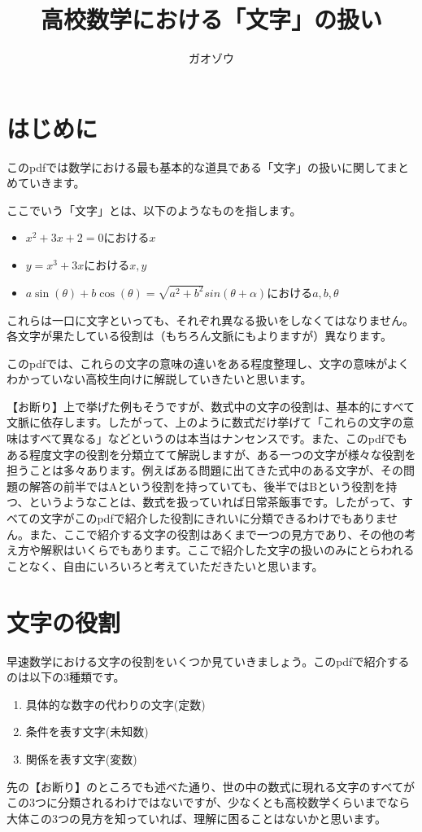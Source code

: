 \documentclass[uplatex,dvipdfmx]{jsarticle}
\title{高校数学における「文字」の扱い}
\author{ガオゾウ}
\begin{document}
	\maketitle
	
	\section{はじめに}
	このpdfでは数学における最も基本的な道具である「文字」の扱いに関してまとめていきます。
	
	ここでいう「文字」とは、以下のようなものを指します。
	\begin{itemize}
		\item $ x^2 + 3x + 2 = 0 $における$x$
		\item $ y = x^3 + 3x $における$x,y$
		\item $ a\sin(\theta) + b\cos(\theta) = \sqrt{a^2+b^2}sin(\theta + \alpha) $における$a,b,\theta$
	\end{itemize}
	
	これらは一口に文字といっても、それぞれ異なる扱いをしなくてはなりません。各文字が果たしている役割は（もちろん文脈にもよりますが）異なります。
	
	このpdfでは、これらの文字の意味の違いをある程度整理し、文字の意味がよくわかっていない高校生向けに解説していきたいと思います。
	
	\vspace{1cm}
	
	【お断り】上で挙げた例もそうですが、数式中の文字の役割は、基本的にすべて文脈に依存します。したがって、上のように数式だけ挙げて「これらの文字の意味はすべて異なる」などというのは本当はナンセンスです。また、このpdfでもある程度文字の役割を分類立てて解説しますが、ある一つの文字が様々な役割を担うことは多々あります。例えばある問題に出てきた式中のある文字が、その問題の解答の前半ではAという役割を持っていても、後半ではBという役割を持つ、というようなことは、数式を扱っていれば日常茶飯事です。したがって、すべての文字がこのpdfで紹介した役割にきれいに分類できるわけでもありません。また、ここで紹介する文字の役割はあくまで一つの見方であり、その他の考え方や解釈はいくらでもあります。ここで紹介した文字の扱いのみにとらわれることなく、自由にいろいろと考えていただきたいと思います。
	
	
	\section{文字の役割}
	早速数学における文字の役割をいくつか見ていきましょう。このpdfで紹介するのは以下の3種類です。
	\begin{enumerate}
		\item 具体的な数字の代わりの文字(定数)
		\item 条件を表す文字(未知数)
		\item 関係を表す文字(変数)
	\end{enumerate}
	先の【お断り】のところでも述べた通り、世の中の数式に現れる文字のすべてがこの3つに分類されるわけではないですが、少なくとも高校数学くらいまでなら大体この3つの見方を知っていれば、理解に困ることはないかと思います。
\end{document}
